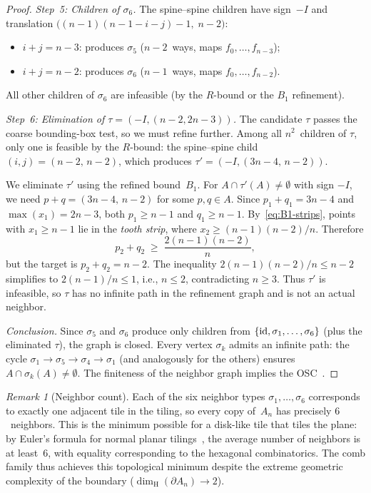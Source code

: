 \documentclass{amsart}
\theoremstyle{definition}
\theoremstyle{remark}
\newtheorem{remark}[theorem]{Remark}
\newcommand{\dH}{\dim_{\mathrm{H}}}
\begin{document}
\begin{proof}
\emph{Step~5: Children of $\sigma_6$.}
The spine--spine children have sign~$-I$ and translation
$\bigl((n{-}1)(n{-}1{-}i{-}j) - 1,\; n{-}2\bigr)$:
\begin{itemize}
\item $i + j = n{-}3$: produces $\sigma_5$
  ($n{-}2$~ways, maps $f_0, \ldots, f_{n-3}$);
\item $i + j = n{-}2$: produces $\sigma_6$
  ($n{-}1$~ways, maps $f_0, \ldots, f_{n-2}$).
\end{itemize}
All other children of $\sigma_6$ are infeasible (by the $R$-bound or
the $B_1$ refinement).

\emph{Step~6: Elimination of $\tau = (-I, (n{-}2, 2n{-}3))$.}
The candidate $\tau$ passes the coarse bounding-box test, so we must
refine further.  Among all $n^2$~children of $\tau$, only one is
feasible by the $R$-bound: the spine--spine child
$(i, j) = (n{-}2,\, n{-}2)$, which produces
$\tau' = (-I, (3n{-}4,\, n{-}2))$.

We eliminate $\tau'$ using the refined bound~$B_1$.  For
$A \cap \tau'(A) \ne \emptyset$ with sign $-I$, we need
$p + q = (3n{-}4,\, n{-}2)$ for some $p, q \in A$.
Since $p_1 + q_1 = 3n{-}4$ and $\max(x_1) = 2n{-}3$, both
$p_1 \ge n{-}1$ and $q_1 \ge n{-}1$.  By~\eqref{eq:B1-strips},
points with $x_1 \ge n{-}1$ lie in the \emph{tooth strip}, where
$x_2 \ge (n{-}1)(n{-}2)/n$.  Therefore
\[
  p_2 + q_2 \;\ge\; \frac{2(n{-}1)(n{-}2)}{n},
\]
but the target is $p_2 + q_2 = n{-}2$.  The inequality
$2(n{-}1)(n{-}2)/n \le n{-}2$ simplifies to $2(n{-}1)/n \le 1$,
i.e., $n \le 2$, contradicting $n \ge 3$.
Thus $\tau'$ is infeasible, so $\tau$ has no infinite path in the
refinement graph and is not an actual neighbor.

\emph{Conclusion.}
Since $\sigma_5$ and $\sigma_6$ produce only children from
$\{{\rm id}, \sigma_1, \ldots, \sigma_6\}$ (plus the eliminated
$\tau$), the graph is closed.  Every vertex $\sigma_k$ admits an
infinite path: the cycle
$\sigma_1 \to \sigma_5 \to \sigma_4 \to \sigma_1$ (and analogously
for the others) ensures $A \cap \sigma_k(A) \ne \emptyset$.
The finiteness of the neighbor graph implies the OSC~\cite{lau-ngai}.
\end{proof}

\begin{remark}[Neighbor count]
\label{rem:neighbor-count}
Each of the six neighbor types $\sigma_1, \ldots, \sigma_6$ corresponds
to exactly one adjacent tile in the tiling, so every copy of~$A_n$ has
precisely $6$~neighbors.  This is the minimum possible for a disk-like
tile that tiles the plane: by Euler's formula for normal planar
tilings~\cite[Section~3.3]{grunbaum-shephard},
the average number of neighbors is at least~$6$, with equality
corresponding to the hexagonal combinatorics.  The comb family thus
achieves this topological minimum despite the extreme geometric
complexity of the boundary ($\dH(\partial A_n) \to 2$).
\end{remark}
\end{document}

